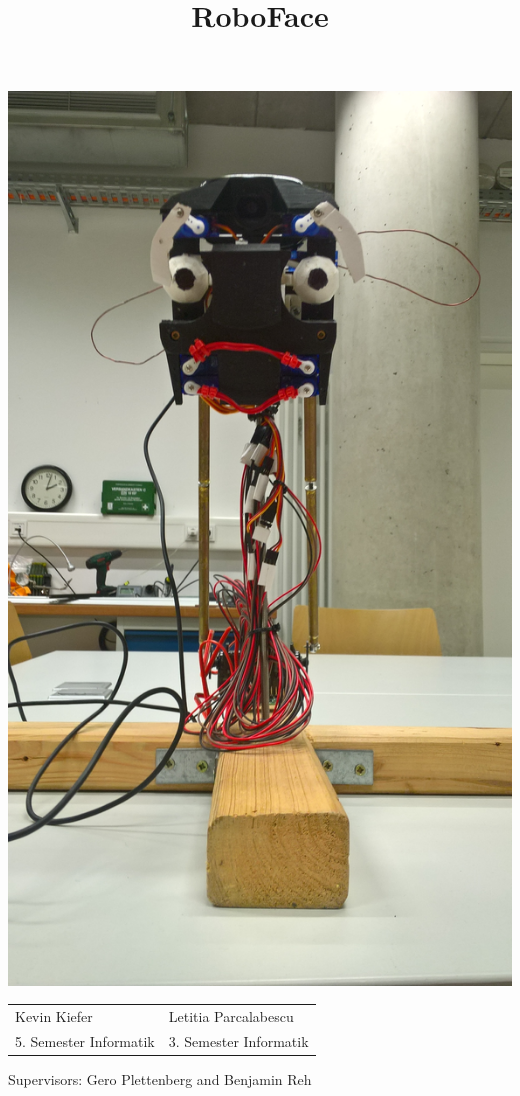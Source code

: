 \documentclass[12.5pt]{scrartcl}
\title{RoboFace}
\date{\vspace{-7ex}}
\begin{document}
 
	\maketitle
	\thispagestyle{empty}
	
	\includegraphics[width=0.88\linewidth]{images/roboFace}
	
	\begin{tabularx}{\textwidth}{Xl} 
		Kevin Kiefer      & Letitia Parcalabescu \\ 
		5. Semester Informatik  & 3. Semester Informatik \\ 
	\end{tabularx}
	
	Supervisors: Gero Plettenberg and Benjamin Reh
	
\end{document}
